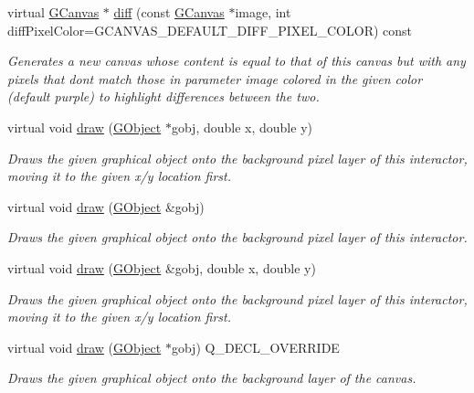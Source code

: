 \begin{DoxyCompactItemize}
virtual \mbox{\hyperlink{classGCanvas}{G\+Canvas}} $\ast$ \mbox{\hyperlink{classGCanvas_a5385d5c8fda55dfe0b20851d293b338b}{diff}} (const \mbox{\hyperlink{classGCanvas}{G\+Canvas}} $\ast$image, int diff\+Pixel\+Color=G\+C\+A\+N\+V\+A\+S\+\_\+\+D\+E\+F\+A\+U\+L\+T\+\_\+\+D\+I\+F\+F\+\_\+\+P\+I\+X\+E\+L\+\_\+\+C\+O\+L\+OR) const
\begin{DoxyCompactList}\small\item\em Generates a new canvas whose content is equal to that of this canvas but with any pixels that don\textquotesingle{}t match those in parameter \textquotesingle{}image\textquotesingle{} colored in the given color (default purple) to highlight differences between the two. \end{DoxyCompactList}\item 
virtual void \mbox{\hyperlink{classGDrawingSurface_acc3825d7a24815d1e2f78e7c3ffea6cc}{draw}} (\mbox{\hyperlink{classGObject}{G\+Object}} $\ast$gobj, double x, double y)
\begin{DoxyCompactList}\small\item\em Draws the given graphical object onto the background pixel layer of this interactor, moving it to the given x/y location first. \end{DoxyCompactList}\item 
virtual void \mbox{\hyperlink{classGDrawingSurface_a022a8d51c7fabcd79a0c809233e93453}{draw}} (\mbox{\hyperlink{classGObject}{G\+Object}} \&gobj)
\begin{DoxyCompactList}\small\item\em Draws the given graphical object onto the background pixel layer of this interactor. \end{DoxyCompactList}\item 
virtual void \mbox{\hyperlink{classGDrawingSurface_a8af8762bd6720e0a1d2a84b190e3dc96}{draw}} (\mbox{\hyperlink{classGObject}{G\+Object}} \&gobj, double x, double y)
\begin{DoxyCompactList}\small\item\em Draws the given graphical object onto the background pixel layer of this interactor, moving it to the given x/y location first. \end{DoxyCompactList}\item 
virtual void \mbox{\hyperlink{classGCanvas_a00bf9d87527d59e6f11756589c25e4e7}{draw}} (\mbox{\hyperlink{classGObject}{G\+Object}} $\ast$gobj) Q\+\_\+\+D\+E\+C\+L\+\_\+\+O\+V\+E\+R\+R\+I\+DE
\begin{DoxyCompactList}\small\item\em Draws the given graphical object onto the background layer of the canvas. \end{DoxyCompactList}\item 

\end{DoxyCompactItemize}
